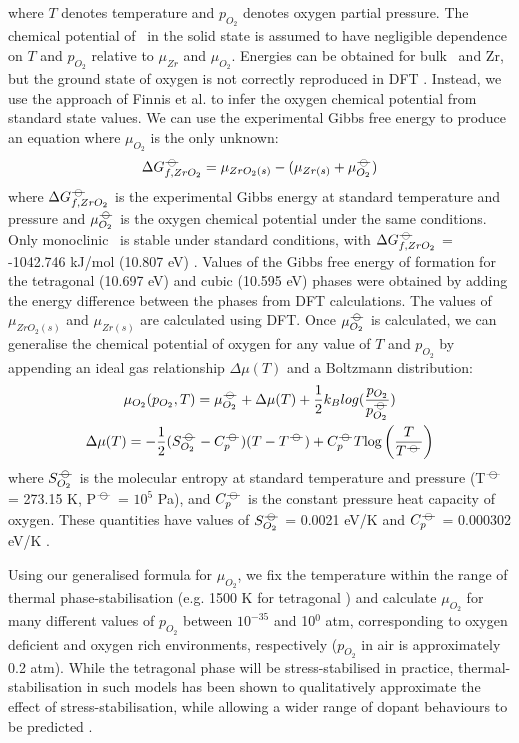 where $T$ denotes temperature and $p_{O_2}$ denotes oxygen partial pressure. The chemical potential of \zirconia\ in the solid state is assumed to have negligible dependence on $T$ and $p_{O_2}$ relative to ${\mu}_{Zr}$ and ${\mu}_{O_2}$. Energies can be obtained for bulk \zirconia\ and Zr, but the ground state of oxygen is not correctly reproduced in DFT \cite{Batyrev2000,Lozovoi2001}. Instead, we use the approach of Finnis et al. \cite{Finnis2005} to infer the oxygen chemical potential from standard state values. We can use the experimental Gibbs free energy to produce an equation where $\mu_{O_2}$ is the only unknown:
\begin{equation}
\Delta{G^{{\ensuremath{-\kern-4pt{\ominus}\kern-4pt-}}}_{f, ZrO_2}} = \mu_{ZrO_2(s)} - (\mu_{Zr(s)} + \mu^{{-\kern-4pt{\ominus}\kern-4pt-}}_{O_2})
\end{equation}
where $\Delta{G^{{\ensuremath{-\kern-4pt{\ominus}\kern-4pt-}}}_{f, ZrO_2}}$ is the experimental Gibbs energy at standard temperature and pressure and $\mu^{{-\kern-4pt{\ominus}\kern-4pt-}}_{O_2}$ is the oxygen chemical potential under the same conditions. Only monoclinic \zirconia\ is stable under standard conditions, with $\Delta{G^{{\ensuremath{-\kern-4pt{\ominus}\kern-4pt-}}}_{f, ZrO_2}}$ = -1042.746 kJ/mol (10.807 eV) \cite{brown2005chemical}. Values of the Gibbs free energy of formation for the tetragonal (10.697 eV) and cubic (10.595 eV) phases were obtained by adding the energy difference between the phases from DFT calculations. The values of $\mu_{ZrO_2(s)}$ and $\mu_{Zr(s)}$ are calculated using DFT. Once $\mu^{{-\kern-4pt{\ominus}\kern-4pt-}}_{O_2}$ is calculated, we can generalise the chemical potential of oxygen for any value of $T$ and $p_{O_2}$ by appending an ideal gas relationship $\Delta{\mu(T)}$ and a Boltzmann distribution:
\begin{gather}
\mu_{O_2}(p_{O_2},T) = \mu^{\plimsoll}_{O_2} + \Delta{\mu(T)} + \frac{1}{2}{k_B}log(\frac{p_{O_2}}{p^{\plimsoll}_{O_2}}) \\
\Delta \mu(T) = -\frac{1}{2}(S^{\plimsoll}_{O_{2}}- C^{\plimsoll}_{p})(T-T^{\plimsoll}) + C^{\plimsoll}_{p}T\textup{log}\left ( \frac{T}{T^{\plimsoll}} \right )
\end{gather} 
where $S^{{-\kern-4pt{\ominus}\kern-4pt-}}_{O_{2}}$ is the molecular entropy at standard temperature and pressure (T$^{{-\kern-4pt{\ominus}\kern-4pt-}}$ = 273.15 K, P$^{{-\kern-4pt{\ominus}\kern-4pt-}}$ = $10^{5}$ Pa), and $C^{{-\kern-4pt{\ominus}\kern-4pt-}}_{p}$ is the constant pressure heat capacity of oxygen. These quantities have values of $S^{{-\kern-4pt{\ominus}\kern-4pt-}}_{O_{2}}$ = 0.0021 eV/K and $C^{{-\kern-4pt{\ominus}\kern-4pt-}}_{p}$ = 0.000302 eV/K \cite{weast1984crc}. 

Using our generalised formula for $\mu_{O_2}$, we fix the temperature within the range of thermal phase-stabilisation (e.g. 1500 K for tetragonal \zirconia) and calculate $\mu_{O_2}$ for many different values of $p_{O_2}$ between $10^{-35}$ and 10$^{0}$ atm, corresponding to oxygen deficient and oxygen rich environments, respectively ($p_{O_2}$ in air is approximately 0.2 atm). While the tetragonal phase will be stress-stabilised in practice, thermal-stabilisation in such models has been shown to qualitatively approximate the effect of stress-stabilisation, while allowing a wider range of dopant behaviours to be predicted \cite{Bell2016}. 

